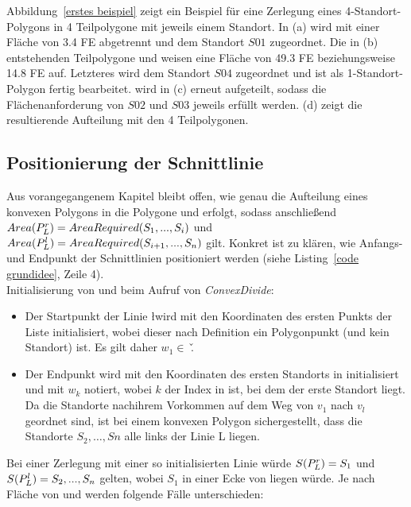 \documentclass[ngerman]{seminarbeitrag}
\begin{document}
Abbildung~\ref{erstes beispiel} zeigt ein Beispiel für eine Zerlegung eines 4-Standort-Polygons in 4 Teilpolygone mit jeweils einem Standort. In (a) wird \prl mit einer Fläche von 3.4 FE abgetrennt und dem Standort $S01$ zugeordnet. Die in (b) entstehenden Teilpolygone \prl und \pll weisen eine Fläche von 49.3 FE beziehungsweise 14.8 FE auf. Letzteres wird dem Standort $S04$ zugeordnet und ist als 1-Standort-Polygon fertig bearbeitet. \prl wird in (c) erneut aufgeteilt, sodass die Flächenanforderung von $S02$ und $S03$ jeweils erfüllt werden. (d) zeigt die resultierende Aufteilung mit den 4 Teilpolygonen.  


\subsection{Positionierung der Schnittlinie}\label{schnittlinie konvex}

Aus vorangegangenem Kapitel bleibt offen, wie genau die Aufteilung eines konvexen Polygons \cp in die Polygone \prl und \pll erfolgt, sodass anschließend
$Area(P_{L}^{r})=AreaRequired(S_{1},...,S_{i})$ und $Area(P_{L}^{l})=AreaRequired(S_{i+1},...,S_{n}) $ gilt.
Konkret ist zu klären, wie Anfangs- und Endpunkt der Schnittlinien positioniert werden (siehe Listing~\ref{code grundidee}, Zeile 4). \\
Initialisierung von \ls und \Le beim Aufruf von \mbox{\textit{ConvexDivide}}:

\begin{itemize}
\item Der Startpunkt \ls der Linie \l wird mit den Koordinaten des ersten Punkts der Liste \w initialisiert, wobei dieser nach Definition ein Polygonpunkt (und
kein Standort) ist. Es gilt daher $w_{1} \in$ \v.
\item Der Endpunkt \Le wird mit den Koordinaten des ersten Standorts in \w initialisiert und mit $w_{k}$ notiert, wobei $k$ der Index in \w ist, bei dem der
erste Standort liegt. Da die Standorte nachihrem Vorkommen auf dem Weg von $v_{1}$ nach $v_{l}$ geordnet sind, ist bei einem konvexen Polygon sichergestellt,
dass die Standorte $S_{2},…,S{n}$ alle links der Linie L liegen.
\end{itemize}

Bei einer Zerlegung mit einer so initialisierten Linie würde $S(P_{L}^{r})=S_{1}$ und $S(P_{L}^{l})=S_{2},...,S_{n}$ gelten, wobei $S_{1}$ in einer Ecke von \prl
liegen würde. Je nach Fläche von \prl und  werden folgende Fälle unterschieden: \\
\end{document}
